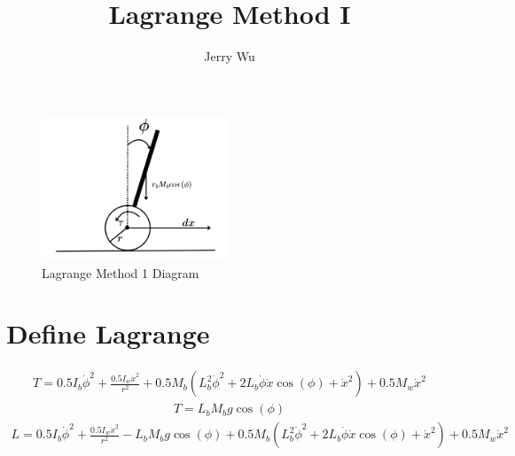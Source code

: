 \documentclass[12pt]{article}
\begin{document}
\title{\Huge Lagrange Method I}
\author{Jerry Wu}
\date{}
\maketitle

\begin{figure}[h]
    \centering
    \includegraphics[width=0.5\textwidth]{Lagrange_Diagram.png}
    \caption{Lagrange Method 1 Diagram}
    \label{fig:your-label}
\end{figure}

\section*{Define Lagrange}
\begin{multline*}
T= 0.5 I_{b} \dot{\phi}^{2} + \frac{0.5 I_{w} \dot{x}^{2}}{r^{2}} + 0.5 M_{b} \left(L_{b}^{2} \dot{\phi}^{2} + 2 L_{b} \dot{\phi} \dot{x} \cos{\left(\phi \right)} + \dot{x}^{2}\right) + 0.5 M_{w} \dot{x}^{2}
\end{multline*}
\begin{multline*}
T= L_{b} M_{b} g \cos{\left(\phi \right)}
\end{multline*}
\begin{multline*}
L= 0.5 I_{b} \dot{\phi}^{2} + \frac{0.5 I_{w} \dot{x}^{2}}{r^{2}} - L_{b} M_{b} g \cos{\left(\phi \right)} + 0.5 M_{b} \left(L_{b}^{2} \dot{\phi}^{2} + 2 L_{b} \dot{\phi} \dot{x} \cos{\left(\phi \right)} + \dot{x}^{2}\right) + 0.5 M_{w} \dot{x}^{2}
\end{multline*}
\end{document}
